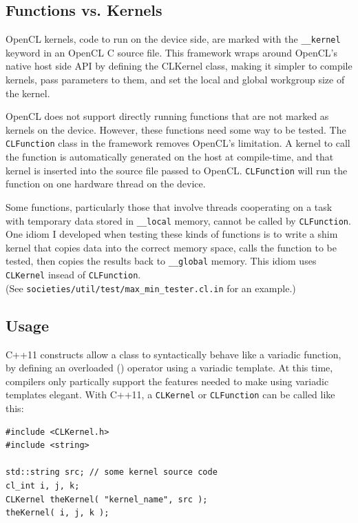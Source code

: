 \documentclass{article}
\begin{document}
\subsection{Functions vs. Kernels}
OpenCL kernels, code to run on the device side, are marked with the \texttt{\_\_kernel} keyword in an OpenCL C source file. This framework wraps around OpenCL's native host side API by defining the CLKernel class, making it simpler to compile kernels, pass parameters to them, and set the local and global workgroup size of the kernel.

OpenCL does not support directly running functions that are not marked as kernels on the device. However, these functions need some way to be tested. The \texttt{CLFunction} class in the framework removes OpenCL's limitation. A kernel to call the function is automatically generated on the host at compile-time, and that kernel is inserted into the source file passed to OpenCL. \texttt{CLFunction} will run the function on one hardware thread on the device.

Some functions, particularly those that involve threads cooperating on a task with temporary data stored in \texttt{\_\_local} memory, cannot be called by \texttt{CLFunction}. One idiom I developed when testing these kinds of functions is to write a shim kernel that copies data into the correct memory space, calls the function to be tested, then copies the results back to \texttt{\_\_global} memory. This idiom uses \texttt{CLKernel} insead of \texttt{CLFunction}. \\ (See \texttt{societies/util/test/max\_min\_tester.cl.in} for an example.)

\subsection{Usage}
C++11 constructs allow a class to syntactically behave like a variadic function, by defining an overloaded () operator using a variadic template. At this time, compilers only partically support the features needed to make using variadic templates elegant. With C++11, a \texttt{CLKernel} or \texttt{CLFunction} can be called like this:

\begin{lstlisting}
#include <CLKernel.h>
#include <string>

std::string src; // some kernel source code
cl_int i, j, k;
CLKernel theKernel( "kernel_name", src );
theKernel( i, j, k );
\end{lstlisting}
\end{document}
